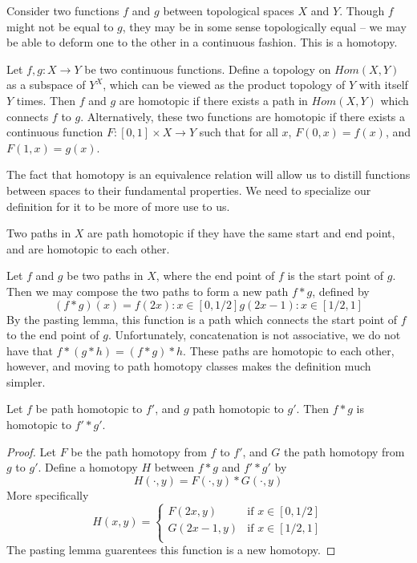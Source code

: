 Consider two functions $f$ and $g$ between topological spaces $X$ and $Y$. Though $f$ might not be equal to $g$, they may be in some sense topologically equal -- we may be able to deform one to the other in a continuous fashion. This is a homotopy.

\begin{definition}
    Let $f,g: X \to Y$ be two continuous functions. Define a topology on $Hom(X,Y)$ as a subspace of $Y^X$, which can be viewed as the product topology of $Y$ with itself $Y$ times. Then $f$ and $g$ are homotopic if there exists a path in $Hom(X,Y)$ which connects $f$ to $g$. Alternatively, these two functions are homotopic if there exists a continuous function $F:[0,1] \times X \to Y$ such that for all $x$, $F(0,x) = f(x)$, and $F(1,x) = g(x)$.
\end{definition}

The fact that homotopy is an equivalence relation will allow us to distill functions between spaces to their fundamental properties. We need to specialize our definition for it to be more of more use to us.

\begin{definition}
    Two paths in $X$ are path homotopic if they have the same start and end point, and are homotopic to each other.
\end{definition}

Let $f$ and $g$ be two paths in $X$, where the end point of $f$ is the start point of $g$. Then we may compose the two paths to form a new path $f * g$, defined by
%
\[ (f * g)(x) = f(2x): x \in [0,1/2]
                g(2x - 1): x \in [1/2,1] \]
%
By the pasting lemma, this function is a path which connects the start point of $f$ to the end point of $g$. Unfortunately, concatenation is not associative, we do not have that $f * (g * h) = (f * g) * h$. These paths are homotopic to each other, however, and moving to path homotopy classes makes the definition much simpler.

\begin{theorem}
    Let $f$ be path homotopic to $f'$, and $g$ path homotopic to $g'$. Then $f * g$ is homotopic to $f' * g'$.
\end{theorem}
\begin{proof}
    Let $F$ be the path homotopy from $f$ to $f'$, and $G$ the path homotopy from $g$ to $g'$. Define a homotopy $H$ between $f * g$ and $f' * g'$ by
    \[ H(\cdot,y) = F(\cdot, y) * G(\cdot, y) \]
    More specifically
    \[ H(x,y) = \begin{cases}
        F(2x,y) & \text{if } x \in [0,1/2]\\
        G(2x - 1,y) & \text{if } x \in [1/2,1]\\
\end{cases} \]
    The pasting lemma guarentees this function is a new homotopy.
\end{proof}

